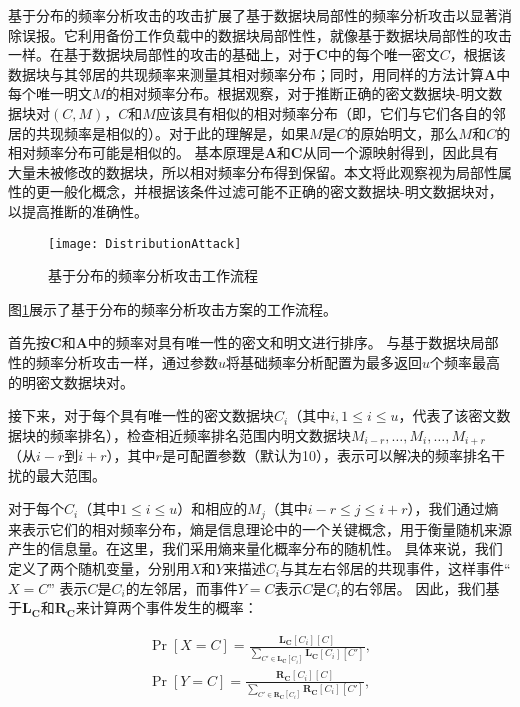 基于分布的频率分析攻击的攻击扩展了基于数据块局部性的频率分析攻击\cite{li2017information}以显著消除误报。它利用备份工作负载中的数据块局部性性，就像基于数据块局部性的攻击一样。在基于数据块局部性的攻击的基础上，对于$\mathbf{C}$中的每个唯一密文$C$，根据该数据块与其邻居的共现频率来测量其相对频率分布；同时，用同样的方法计算$\mathbf{A}$中每个唯一明文$M$的相对频率分布。根据观察，对于推断正确的密文数据块-明文数据块对$(C,M)$，$C$和$M$应该具有相似的相对频率分布（即，它们与它们各自的邻居的共现频率是相似的）。对于此的理解是，如果$M$是$C$的原始明文，那么$M$和$C$的相对频率分布可能是相似的。 基本原理是$\mathbf{A}$和$\mathbf{C}$从同一个源映射得到，因此具有大量未被修改的数据块，所以相对频率分布得到保留。本文将此观察视为局部性属性的更一般化概念，并根据该条件过滤可能不正确的密文数据块-明文数据块对，以提高推断的准确性。

\begin{figure}[!htb]
    \small
    \centering
    \texttt{[image: DistributionAttack]}
    \caption{基于分布的频率分析攻击工作流程} 
    \label{fig:基于分布的频率分析攻击工作流程}
\end{figure}

图\ref{fig:基于分布的频率分析攻击工作流程}展示了基于分布的频率分析攻击方案的工作流程。

首先按$\mathbf{C}$和$\mathbf{A}$中的频率对具有唯一性的密文和明文进行排序。 与基于数据块局部性的频率分析攻击一样，通过参数$u$将基础频率分析配置为最多返回$u$个频率最高的明密文数据块对。

接下来，对于每个具有唯一性的密文数据块$C_i$（其中$i, 1 \leq i \leq u$，代表了该密文数据块的频率排名），检查相近频率排名范围内明文数据块$M_{i-r}, \ldots, M_i, \ldots, M_{i+r}$（从$i-r$到$i+r$），其中$r$是可配置参数（默认为10），表示可以解决的频率排名干扰的最大范围。

对于每个$C_i$（其中$1 \leq i \leq u$）和相应的$M_j$（其中$i-r\le j\le i+r$），我们通过熵来表示它们的相对频率分布，熵是信息理论中的一个关键概念，用于衡量随机来源产生的信息量。在这里，我们采用熵来量化概率分布的随机性。 具体来说，我们定义了两个随机变量，分别用$X$和$Y$来描述$C_i$与其左右邻居的共现事件，这样事件“$X = C$” 表示$C$是$C_i$的左邻居，而事件$Y = C$表示$C$是$C_i$的右邻居。 因此，我们基于$\mathbf{L_C}$和$\mathbf{R_C}$来计算两个事件发生的概率：

\begin{eqnarray}
    \Pr[X = C] = \frac{\mathbf{L_C}[C_i][C]}{\sum_{C' \in \mathbf{L_C}[C_i]} \mathbf{L_C}[C_i][C']}, \nonumber \\
    \Pr[Y = C] = \frac{\mathbf{R_C}[C_i][C]}{\sum_{C' \in \mathbf{R_C}[C_i]} \mathbf{R_C}[C_i][C']}, \nonumber
\end{eqnarray}

